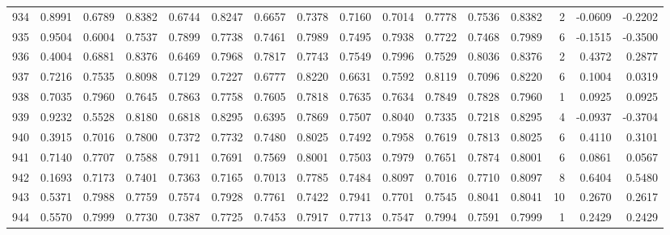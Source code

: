 \begin{tabular}{lrrrrrrrrrrrrrrr}
934 &      0.8991 &  0.6789 &  0.8382 &  0.6744 &  0.8247 &  0.6657 &  0.7378 &  0.7160 &  0.7014 &  0.7778 &   0.7536 &     0.8382 &      2 &                   -0.0609 &                    -0.2202 \\
935 &      0.9504 &  0.6004 &  0.7537 &  0.7899 &  0.7738 &  0.7461 &  0.7989 &  0.7495 &  0.7938 &  0.7722 &   0.7468 &     0.7989 &      6 &                   -0.1515 &                    -0.3500 \\
936 &      0.4004 &  0.6881 &  0.8376 &  0.6469 &  0.7968 &  0.7817 &  0.7743 &  0.7549 &  0.7996 &  0.7529 &   0.8036 &     0.8376 &      2 &                    0.4372 &                     0.2877 \\
937 &      0.7216 &  0.7535 &  0.8098 &  0.7129 &  0.7227 &  0.6777 &  0.8220 &  0.6631 &  0.7592 &  0.8119 &   0.7096 &     0.8220 &      6 &                    0.1004 &                     0.0319 \\
938 &      0.7035 &  0.7960 &  0.7645 &  0.7863 &  0.7758 &  0.7605 &  0.7818 &  0.7635 &  0.7634 &  0.7849 &   0.7828 &     0.7960 &      1 &                    0.0925 &                     0.0925 \\
939 &      0.9232 &  0.5528 &  0.8180 &  0.6818 &  0.8295 &  0.6395 &  0.7869 &  0.7507 &  0.8040 &  0.7335 &   0.7218 &     0.8295 &      4 &                   -0.0937 &                    -0.3704 \\
940 &      0.3915 &  0.7016 &  0.7800 &  0.7372 &  0.7732 &  0.7480 &  0.8025 &  0.7492 &  0.7958 &  0.7619 &   0.7813 &     0.8025 &      6 &                    0.4110 &                     0.3101 \\
941 &      0.7140 &  0.7707 &  0.7588 &  0.7911 &  0.7691 &  0.7569 &  0.8001 &  0.7503 &  0.7979 &  0.7651 &   0.7874 &     0.8001 &      6 &                    0.0861 &                     0.0567 \\
942 &      0.1693 &  0.7173 &  0.7401 &  0.7363 &  0.7165 &  0.7013 &  0.7785 &  0.7484 &  0.8097 &  0.7016 &   0.7710 &     0.8097 &      8 &                    0.6404 &                     0.5480 \\
943 &      0.5371 &  0.7988 &  0.7759 &  0.7574 &  0.7928 &  0.7761 &  0.7422 &  0.7941 &  0.7701 &  0.7545 &   0.8041 &     0.8041 &     10 &                    0.2670 &                     0.2617 \\
944 &      0.5570 &  0.7999 &  0.7730 &  0.7387 &  0.7725 &  0.7453 &  0.7917 &  0.7713 &  0.7547 &  0.7994 &   0.7591 &     0.7999 &      1 &                    0.2429 &                     0.2429 \\

\end{tabular}
